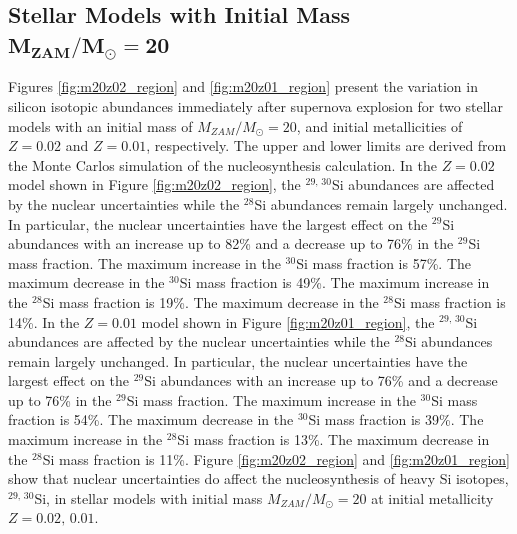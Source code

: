 \documentclass{brandeis-thesis3.2}
\def \msun {M_{\odot}}
\newcommand{\iso}[2]{$^{#1}${#2}}
\begin{document}
\subsection[Stellar Models with Initial Mass $M_{ZAM}/\msun = 20$]{Stellar Models with Initial Mass $\mathbf{M_{ZAM}/\msun = 20}$}
Figures \ref{fig:m20z02_region} and \ref{fig:m20z01_region} present the variation in silicon isotopic abundances immediately after supernova explosion for two stellar models with an initial mass of $M_{ZAM}/\msun =20$, and initial metallicities of $Z=0.02$ and $Z=0.01$, respectively. The upper and lower limits are derived from the Monte Carlos simulation of the nucleosynthesis calculation. In the $Z=0.02$ model shown in Figure \ref{fig:m20z02_region}, the \iso{29, \, 30}{Si} abundances are affected by the nuclear uncertainties while the \iso{28}{Si} abundances remain largely unchanged. In particular, the nuclear uncertainties have the largest effect on the \iso{29}{Si} abundances with an increase up to 82\% and a decrease up to 76\% in the \iso{29}{Si} mass fraction. The maximum increase in the \iso{30}{Si} mass fraction is 57\%. The maximum decrease in the \iso{30}{Si} mass fraction is 49\%. The maximum increase in the \iso{28}{Si} mass fraction is 19\%. The maximum decrease in the \iso{28}{Si} mass fraction is 14\%. In the $Z=0.01$ model shown in Figure \ref{fig:m20z01_region}, the \iso{29, \, 30}{Si} abundances are affected by the nuclear uncertainties while the \iso{28}{Si} abundances remain largely unchanged. In particular, the nuclear uncertainties have the largest effect on the \iso{29}{Si} abundances with an increase up to 76\% and a decrease up to 76\% in the \iso{29}{Si} mass fraction. The maximum increase in the \iso{30}{Si} mass fraction is 54\%. The maximum decrease in the \iso{30}{Si} mass fraction is 39\%. The maximum increase in the \iso{28}{Si} mass fraction is 13\%. The maximum decrease in the \iso{28}{Si} mass fraction is 11\%. Figure \ref{fig:m20z02_region} and \ref{fig:m20z01_region} show that nuclear uncertainties do affect the nucleosynthesis of heavy Si isotopes, \iso{29,\, 30}{Si}, in stellar models with initial mass $M_{ZAM}/\msun =20$ at initial metallicity $Z=0.02,\, 0.01$. 
\end{document}
